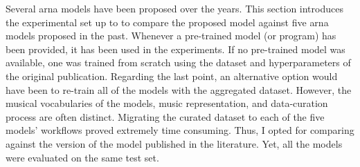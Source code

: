 
Several \gls{arna} models have been proposed over the years.
This section introduces the experimental set up to to
compare the proposed model against five \gls{arna} models
proposed in the past. Whenever a pre-trained model (or
program) has been provided, it has been used in the
experiments. If no pre-trained model was available, one was
trained from scratch using the dataset and hyperparameters
of the original publication. Regarding the last point, an
alternative option would have been to re-train all of the
models with the aggregated dataset. However, the musical
vocabularies of the models, music representation, and
data-curation process are often distinct. Migrating the
curated dataset to each of the five models' workflows proved
extremely time consuming. Thus, I opted for comparing
against the version of the model published in the
literature. Yet, all the models were evaluated on the same
test set.
